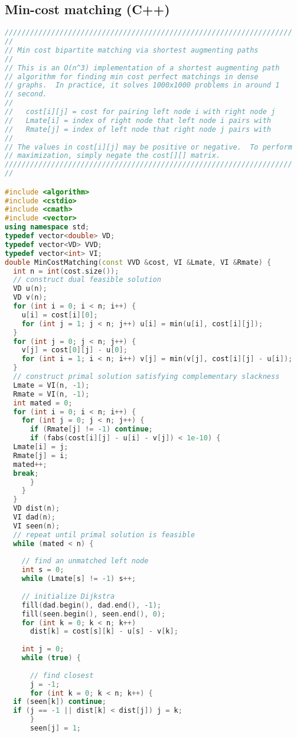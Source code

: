 \subsection{Min-cost matching (C++)}
\begin{lstlisting}[language=C++]
////////////////////////////////////////////////////////////////////
//
// Min cost bipartite matching via shortest augmenting paths
//
// This is an O(n^3) implementation of a shortest augmenting path
// algorithm for finding min cost perfect matchings in dense
// graphs.  In practice, it solves 1000x1000 problems in around 1
// second.
//
//   cost[i][j] = cost for pairing left node i with right node j
//   Lmate[i] = index of right node that left node i pairs with
//   Rmate[j] = index of left node that right node j pairs with
//
// The values in cost[i][j] may be positive or negative.  To perform
// maximization, simply negate the cost[][] matrix.
////////////////////////////////////////////////////////////////////
//

#include <algorithm>
#include <cstdio>
#include <cmath>
#include <vector>
using namespace std;
typedef vector<double> VD;
typedef vector<VD> VVD;
typedef vector<int> VI;
double MinCostMatching(const VVD &cost, VI &Lmate, VI &Rmate) {
  int n = int(cost.size());
  // construct dual feasible solution
  VD u(n);
  VD v(n);
  for (int i = 0; i < n; i++) {
    u[i] = cost[i][0];
    for (int j = 1; j < n; j++) u[i] = min(u[i], cost[i][j]);
  }
  for (int j = 0; j < n; j++) {
    v[j] = cost[0][j] - u[0];
    for (int i = 1; i < n; i++) v[j] = min(v[j], cost[i][j] - u[i]);
  }
  // construct primal solution satisfying complementary slackness
  Lmate = VI(n, -1);
  Rmate = VI(n, -1);
  int mated = 0;
  for (int i = 0; i < n; i++) {
    for (int j = 0; j < n; j++) {
      if (Rmate[j] != -1) continue;
      if (fabs(cost[i][j] - u[i] - v[j]) < 1e-10) {
  Lmate[i] = j;
  Rmate[j] = i;
  mated++;
  break;
      }
    }
  }
  VD dist(n);
  VI dad(n);
  VI seen(n);
  // repeat until primal solution is feasible
  while (mated < n) {
    
    // find an unmatched left node
    int s = 0;
    while (Lmate[s] != -1) s++;
    
    // initialize Dijkstra
    fill(dad.begin(), dad.end(), -1);
    fill(seen.begin(), seen.end(), 0);
    for (int k = 0; k < n; k++) 
      dist[k] = cost[s][k] - u[s] - v[k];
    
    int j = 0;
    while (true) {
      
      // find closest
      j = -1;
      for (int k = 0; k < n; k++) {
  if (seen[k]) continue;
  if (j == -1 || dist[k] < dist[j]) j = k;
      }
      seen[j] = 1;
      

\end{lstlisting}
